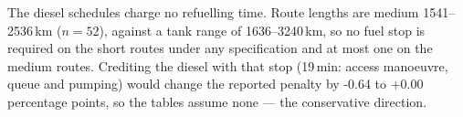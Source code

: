 The diesel schedules charge no refuelling time.  Route lengths are medium 1541--2536\,km ($n=52$), against a tank range of 1636--3240\,km, so no fuel stop is required on the short routes under any specification and at most one on the medium routes.  Crediting the diesel with that stop (19\,min: access manoeuvre, queue and pumping) would change the reported penalty by -0.64 to +0.00\,percentage points, so the tables assume none --- the conservative direction.

